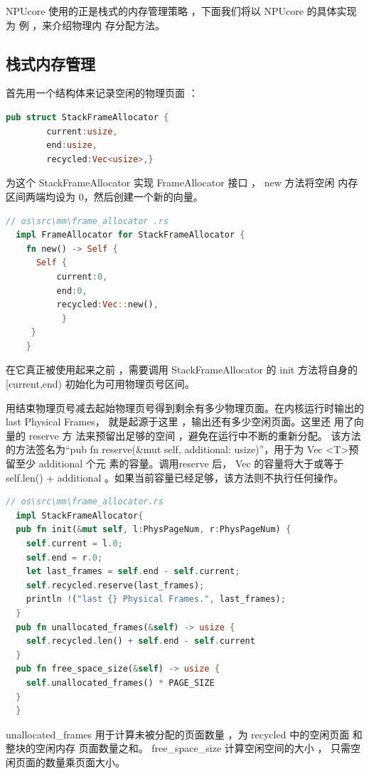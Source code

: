 	NPUcore 使用的正是栈式的内存管理策略 ，下面我们将以 NPUcore 的具体实现为
	例 ，来介绍物理内 存分配方法。
	\subsection{栈式内存管理}
	首先用一个结构体来记录空闲的物理页面 ：
	\begin{lstlisting}[language=Rust]
	pub struct StackFrameAllocator {
        current:usize,     
        end:usize,         
        recycled:Vec<usize>,}
	\end{lstlisting}
	为这个 StackFrameAllocator 实现 FrameAllocator 接口 ，   new 方法将空闲
	内存区间两端均设为 0，然后创建一个新的向量。
\begin{lstlisting}[language=Rust]
  // os\src\mm\frame_allocator .rs
  impl FrameAllocator for StackFrameAllocator {
    fn new() -> Self {
	  Self {
		  current:0,
		  end:0,
		  recycled:Vec::new(),
	       }
	 }
    }
\end{lstlisting}
	
	在它真正被使用起来之前 ，需要调用 StackFrameAllocator 的  init 方法将自身的  [current,end) 初始化为可用物理页号区间。
	
	用结束物理页号减去起始物理页号得到剩余有多少物理页面。在内核运行时输出的 last {} Physical Frames， 就是起源于这里 ，输出还有多少空闲页面。这里还
	用了向量的 reserve 方 法来预留出足够的空间 ，避免在运行中不断的重新分配。
	该方法的方法签名为“pub fn reserve(\&mut self, additional: usize)”，用于为 Vec \textless T\textgreater 预留至少 additional 个元
	素的容量。调用reserve 后， Vec 的容量将大于或等于 self.len() + additional
	。如果当前容量已经足够，该方法则不执行任何操作。
	
\begin{lstlisting}[language=Rust]
  // os\src\mm\frame_allocator.rs
  impl StackFrameAllocator{
  pub fn init(&mut self, l:PhysPageNum, r:PhysPageNum) {
    self.current = l.0;
    self.end = r.0;
    let last_frames = self.end - self.current;
    self.recycled.reserve(last_frames);
    println !("last {} Physical Frames.", last_frames);
  }
  pub fn unallocated_frames(&self) -> usize {
    self.recycled.len() + self.end - self.current
  }
  pub fn free_space_size(&self) -> usize {
    self.unallocated_frames() * PAGE_SIZE
  }
  }
\end{lstlisting}
	
	unallocated\_frames 用于计算未被分配的页面数量 ，为 recycled 中的空闲页面
	和整块的空闲内存 页面数量之和。   free\_space\_size 计算空闲空间的大小 ，
	只需空闲页面的数量乘页面大小。

